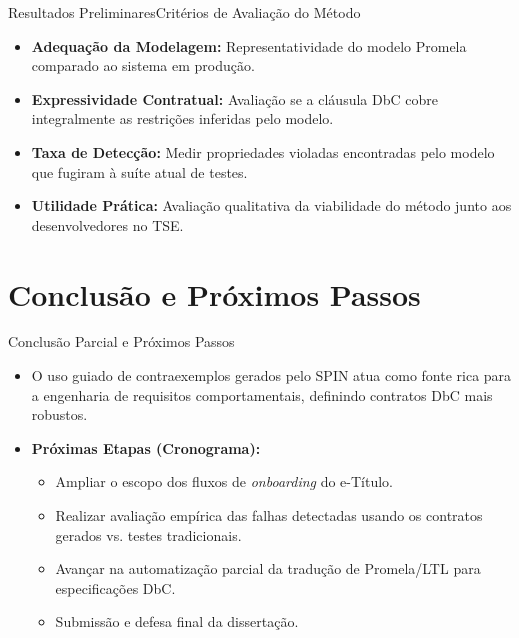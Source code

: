 \documentclass[10pt]{beamer}
\begin{document}
\begin{frame}{Resultados Preliminares}{Critérios de Avaliação do Método}
  \begin{itemize}
    \item \textbf{Adequação da Modelagem:} Representatividade do modelo Promela comparado ao sistema em produção.
    \item \textbf{Expressividade Contratual:} Avaliação se a cláusula DbC cobre integralmente as restrições inferidas pelo modelo.
    \item \textbf{Taxa de Detecção:} Medir propriedades violadas encontradas pelo modelo que fugiram à suíte atual de testes.
    \item \textbf{Utilidade Prática:} Avaliação qualitativa da viabilidade do método junto aos desenvolvedores no TSE.
  \end{itemize}
\end{frame}


\section{Conclusão e Próximos Passos}
\begin{frame}{Conclusão Parcial e Próximos Passos}
  \begin{itemize}
    \item O uso guiado de contraexemplos gerados pelo SPIN atua como fonte rica para a engenharia de requisitos comportamentais, definindo contratos DbC mais robustos.
    \item \textbf{Próximas Etapas (Cronograma):}
    \begin{itemize}
        \item Ampliar o escopo dos fluxos de \textit{onboarding} do e-Título.
        \item Realizar avaliação empírica das falhas detectadas usando os contratos gerados vs. testes tradicionais.
        \item Avançar na automatização parcial da tradução de Promela/LTL para especificações DbC.
        \item Submissão e defesa final da dissertação.
    \end{itemize}
  \end{itemize}
\end{frame}


{
\begin{frame}
\end{frame}}
\end{document}

